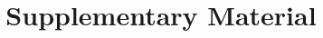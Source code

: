 \documentclass[preprint,12pt,authoryear]{elsarticle}
\begin{document}



\title{Supplementary Material} %





% 
\end{document}

